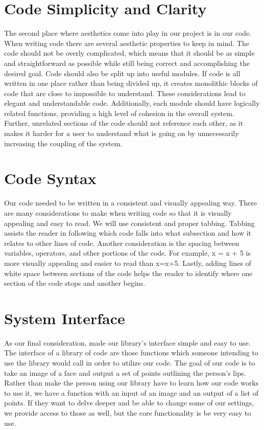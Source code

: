 \section{Code Simplicity and Clarity}
The second place where aesthetics come into play in our project is in our code. When writing code there are several aesthetic properties to keep in mind. The code should not be overly complicated, which means that it should be as simple and straightforward as possible while still being correct and accomplishing the desired goal. Code should also be split up into useful modules. If code is all written in one place rather than being divided up, it creates monolithic blocks of code that are close to impossible to understand. These considerations lead to elegant and understandable code. Additionally, each module should have logically related functions, providing a high level of cohesion in the overall system. Further, unrelated sections of the code should not reference each other, as it makes it harder for a user to understand what is going on by unnecessarily increasing the coupling of the system.

\section{Code Syntax}
Our code needed to be written in a consistent and visually appealing way. There are many considerations to make when writing code so that it is visually appealing and easy to read. We will use consistent and proper tabbing. Tabbing assists the reader in following which code falls into what subsection and how it relates to other lines of code. Another consideration is the spacing between variables, operators, and other portions of the code. For example, x = x + 5 is more visually appealing and easier to read than x=x+5. Lastly, adding lines of white space between sections of the code helps the reader to identify where one section of the code stops and another begins.

\section{System Interface}
As our final consideration, made our library's interface simple and easy to use. The interface of a library of code are those functions which someone intending to use the library would call in order to utilize our code. The goal of our code is to take an image of a face and output a set of points outlining the person's lips. Rather than make the person using our library have to learn how our code works to use it, we have a function with an input of an image and an output of a list of points. If they want to delve deeper and be able to change some of our settings, we provide access to those as well, but the core functionality is be very easy to use.
